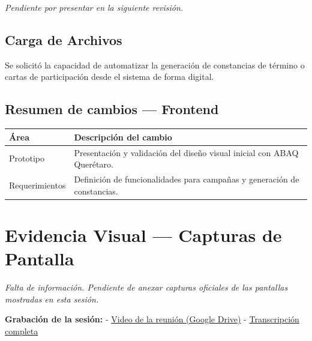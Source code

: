 \emph{Pendiente por presentar en la siguiente revisión.}

\subsection{Carga de Archivos}\label{carga-de-archivos}

Se solicitó la capacidad de automatizar la generación de constancias de
término o cartas de participación desde el sistema de forma digital.

\subsection{Resumen de cambios ---
Frontend}\label{resumen-de-cambios-frontend}

{\def\LTcaptype{none} %
\begin{longtable}[]{@{}
  >{\raggedright\arraybackslash}p{}
  >{\raggedright\arraybackslash}p{}@{}}
\toprule\noalign{}
\begin{minipage}[b]{\linewidth}\raggedright
Área
\end{minipage} & \begin{minipage}[b]{\linewidth}\raggedright
Descripción del cambio
\end{minipage} \\
\midrule\noalign{}
\endhead
\bottomrule\noalign{}
\endlastfoot
Prototipo & Presentación y validación del diseño visual inicial con ABAQ
Querétaro. \\
Requerimientos & Definición de funcionalidades para campañas y
generación de constancias. \\
\end{longtable}
}

\section{Evidencia Visual --- Capturas de
Pantalla}\label{evidencia-visual-capturas-de-pantalla}

\emph{Falta de información. Pendiente de anexar capturas oficiales de
las pantallas mostradas en esta sesión.}

\textbf{Grabación de la sesión:} -
\href{https://drive.google.com/file/d/12Xn17K2BIbEWz3Z9l_Kl-2G0lruFW_V7/view?usp=drive_web}{Video
de la reunión (Google Drive)} -
\href{https://docs.google.com/document/d/1g4qWQUz1eiLQI4deqAT1OupZSXW5JZhgj2tcH8KcMl0/edit?usp=drive_web}{Transcripción
completa}

